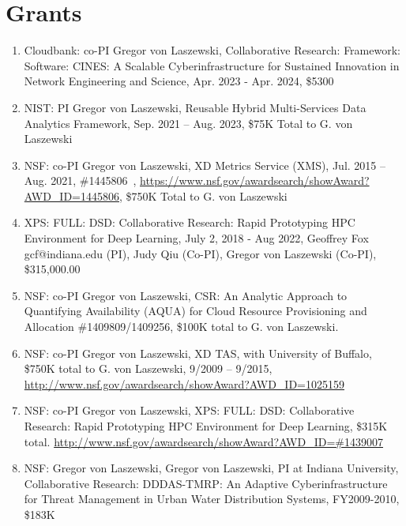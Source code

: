 \documentclass{article}
\begin{document}
\section{Grants}

\begin{enumerate}


\item Cloudbank: co-PI Gregor von Laszewski, Collaborative Research: Framework: Software: CINES: A Scalable Cyberinfrastructure for Sustained Innovation in Network Engineering and Science, Apr. 2023 - Apr. 2024, \$5300
\item NIST: PI Gregor von Laszewski, Reusable Hybrid Multi-Services Data Analytics Framework, Sep. 2021 – Aug. 2023, \$75K Total to G. von Laszewski
\item  NSF: co-PI Gregor von Laszewski, XD Metrics Service (XMS), Jul. 2015 – Aug. 2021, \#1445806 , \url{https://www.nsf.gov/awardsearch/showAward?AWD_ID=1445806}, \$750K Total to G. von Laszewski
\item  XPS: FULL: DSD: Collaborative Research: Rapid Prototyping HPC Environment for Deep Learning, July 2, 2018 - Aug 2022, Geoffrey Fox gcf@indiana.edu (PI), Judy Qiu (Co-PI), Gregor von Laszewski (Co-PI), 	\$315,000.00
\item  NSF: co-PI Gregor von Laszewski, CSR: An Analytic Approach to Quantifying Availability (AQUA) for Cloud Resource Provisioning and Allocation \#1409809/1409256, \$100K total to G. von Laszewski. 

\item  NSF: co-PI Gregor von Laszewski, XD TAS, with University of Buffalo, \$750K total to G. von Laszewski, 9/2009 – 9/2015, \url{http://www.nsf.gov/awardsearch/showAward?AWD_ID=1025159}

\item  NSF: co-PI Gregor von Laszewski, XPS: FULL: DSD: Collaborative Research: Rapid Prototyping HPC Environment for Deep Learning, \$315K total.
  \url{http://www.nsf.gov/awardsearch/showAward?AWD_ID=\#1439007}

\item  NSF: Gregor von Laszewski, Gregor von Laszewski, PI at Indiana University, Collaborative Research: DDDAS-TMRP: An Adaptive Cyberinfrastructure for Threat Management in Urban Water Distribution Systems, FY2009-2010, \$183K
  

\end{enumerate}
\end{document}

